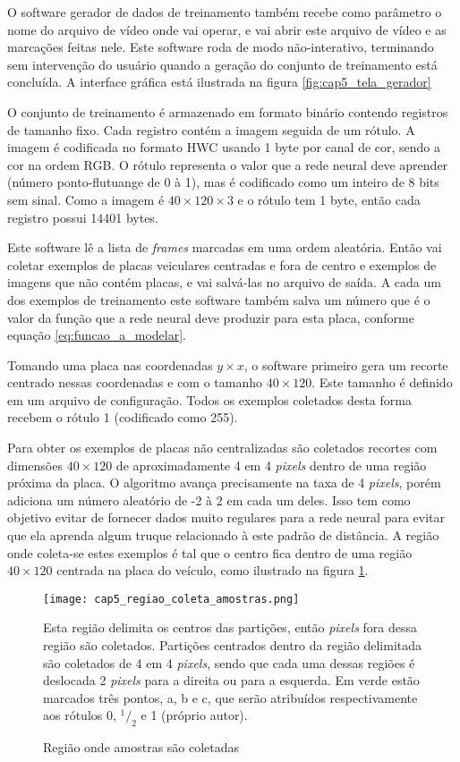 O software gerador de dados de treinamento também recebe como parâmetro o nome
do arquivo de vídeo onde vai operar, e vai abrir este arquivo de vídeo e as
marcações feitas nele. Este software roda de modo não-interativo,
terminando sem intervenção do usuário quando a geração do conjunto de
treinamento está concluída. A interface gráfica está ilustrada na figura
\ref{fig:cap5_tela_gerador}

O conjunto de treinamento é armazenado em formato binário contendo registros de
tamanho fixo. Cada registro contém a imagem seguida de um rótulo. A
imagem é codificada no formato HWC usando 1 byte por canal de cor,
sendo a cor na ordem RGB. O rótulo representa o valor que a rede neural
deve aprender (número ponto-flutuange de 0 à 1), mas é codificado como um
inteiro de
8 bits sem sinal.  Como a imagem é $40 \times 120 \times 3$ e o rótulo
tem 1 byte, então cada registro possui 14401 bytes.

Este software lê a lista de \emph{frames} marcadas em uma ordem
aleatória. Então vai coletar exemplos de placas veiculares centradas e fora
de centro e exemplos de imagens que não contém placas, e vai salvá-las no
arquivo de saída. A cada um dos exemplos de treinamento este software
também salva um número que é o valor da função que a rede neural deve
produzir para esta placa, conforme equação \ref{eq:funcao_a_modelar}.

Tomando uma placa nas coordenadas $y \times x$, o software primeiro gera um
recorte centrado nessas coordenadas e com o tamanho $40 \times 120$. Este
tamanho é definido em um arquivo de configuração. Todos os exemplos
coletados desta forma recebem o rótulo 1 (codificado como 255).

Para obter os exemplos de placas não centralizadas são coletados recortes
com dimensões $40 \times 120$ de
aproximadamente 4 em 4 \emph{pixels} dentro de uma região próxima da placa. O
algoritmo avança precisamente na taxa de 4 \emph{pixels}, porém adiciona um
número aleatório de -2 à 2 em cada um deles. Isso tem como objetivo evitar de
fornecer dados muito regulares para a rede neural para evitar que ela
aprenda algum truque relacionado à este padrão de distância. A região onde
coleta-se estes exemplos é tal que o centro fica dentro de uma região
$40 \times 120$ centrada na placa do veículo, como ilustrado na figura
\ref{fig:cap5_regiao_coleta_amostras}.

\begin{figure}[!htb]
	\centering
	\texttt{[image: cap5\_regiao\_coleta\_amostras.png]}
	\caption{Região onde amostras são coletadas}
	\label{fig:cap5_regiao_coleta_amostras}
	Esta região delimita os centros das partições, então \emph{pixels} fora
	dessa região são coletados. Partições centrados dentro da região delimitada
	são coletados de 4 em 4 \emph{pixels}, sendo que cada uma dessas regiões é
	deslocada 2 \emph{pixels} para a direita ou para a esquerda. Em verde estão
	marcados três pontos, a, b e c, que serão atribuídos respectivamente aos
	rótulos 0, $^1/_2$ e 1 (próprio autor).
\end{figure}

